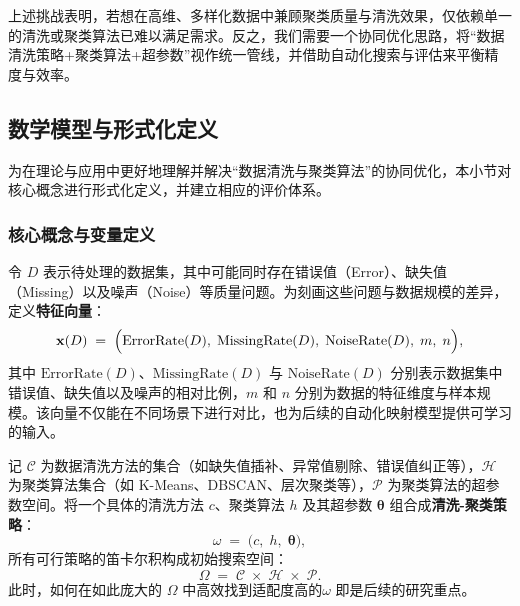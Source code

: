 \documentclass[10pt]{article} %
\numberwithin{equation}{section}
\begin{document}
上述挑战表明，若想在高维、多样化数据中兼顾聚类质量与清洗效果，仅依赖单一的清洗或聚类算法已难以满足需求。反之，我们需要一个协同优化思路，将“数据清洗策略+聚类算法+超参数”视作统一管线，并借助自动化搜索与评估来平衡精度与效率。

\subsection{数学模型与形式化定义}\label{subsec:formal-definition}

为在理论与应用中更好地理解并解决“数据清洗与聚类算法”的协同优化，本小节对核心概念进行形式化定义，并建立相应的评价体系。

\subsubsection{核心概念与变量定义}
令 \(D\) 表示待处理的数据集，其中可能同时存在错误值（Error）、缺失值（Missing）以及噪声（Noise）等质量问题。为刻画这些问题与数据规模的差异，定义\textbf{特征向量}：
\begin{equation}\label{eq:xD}
  \mathbf{x}(D) 
  \;=\; 
  \Bigl(\mathrm{ErrorRate}(D),\;\mathrm{MissingRate}(D),\;\mathrm{NoiseRate}(D),\; m,\; n\Bigr),
\end{equation}
其中 \(\mathrm{ErrorRate}(D)\)、\(\mathrm{MissingRate}(D)\) 与 \(\mathrm{NoiseRate}(D)\) 分别表示数据集中错误值、缺失值以及噪声的相对比例，\(m\) 和 \(n\) 分别为数据的特征维度与样本规模。该向量不仅能在不同场景下进行对比，也为后续的自动化映射模型提供可学习的输入。

记 \(\mathcal{C}\) 为数据清洗方法的集合（如缺失值插补、异常值剔除、错误值纠正等），\(\mathcal{H}\) 为聚类算法集合（如 K-Means、DBSCAN、层次聚类等），\(\mathcal{P}\) 为聚类算法的超参数空间。将一个具体的清洗方法 \(c\)、聚类算法 \(h\) 及其超参数 \(\boldsymbol{\theta}\) 组合成\textbf{清洗-聚类策略}：
\begin{equation}\label{eq:omega}
  \omega 
  \;=\; 
  \bigl(c,\; h,\; \boldsymbol{\theta}\bigr),
\end{equation}
所有可行策略的笛卡尔积构成初始搜索空间：
\begin{equation}\label{eq:Omega}
  \Omega 
  \;=\; 
  \mathcal{C} \;\times\; \mathcal{H} \;\times\; \mathcal{P}.
\end{equation}
此时，如何在如此庞大的 \(\Omega\) 中高效找到适配度高的\(\omega\) 即是后续的研究重点。
\end{document}
